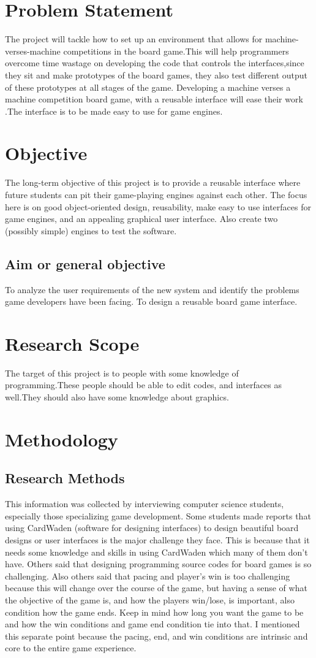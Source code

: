 \documentclass[a4paper,6pt]{article}
\begin{document}
\section{ Problem Statement}
The project will tackle how to set up an environment that allows for machine-verses-machine competitions in the board game.This will help programmers overcome time wastage on developing the code that controls the interfaces,since they sit and make prototypes of the board games, they also test different output of these prototypes at all stages of the game. Developing a machine verses a machine competition board game, with a reusable interface will ease their work .The interface is to be made easy to use for game engines.
\section{Objective}
The long-term objective of this project is to provide a reusable interface where future students can pit their game-playing engines against each other. The focus here is on good object-oriented design, reusability, make easy to use interfaces for game engines, and an appealing graphical user interface. Also create two (possibly simple) engines to test the software.
\subsection{Aim or general objective}
To analyze the user requirements of the new system and identify the problems game developers have been facing.
To design a reusable board game interface.
\section{Research Scope}
The target of this project is to people with some knowledge of programming.These people should be able to edit codes, and interfaces as well.They should also have some knowledge about graphics.
\section{Methodology}
\subsection{Research Methods}
This information was collected by interviewing computer science students, especially those specializing game development. Some students made reports that using CardWaden (software for designing interfaces) to design beautiful board designs or user interfaces is the major challenge they face. This is because that it needs some knowledge and skills in using CardWaden which many of them don’t have. Others said that designing programming source codes for board games is so challenging.  Also others said that pacing and player's win is too challenging because this will change over the course of the game, but having a sense of what the objective of the game is, and how the players win/lose, is important, also condition how the game ends. Keep in mind how long you want the game to be and how the win conditions and game end condition tie into that. I mentioned this separate point because the pacing, end, and win conditions are intrinsic and core to the entire game experience.
\end{document}
